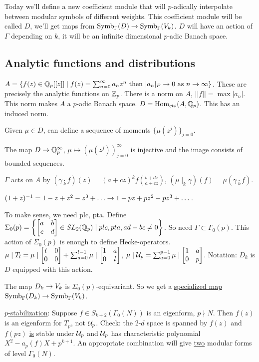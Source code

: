 \documentclass[]{article}
\begin{document}
Today we'll define a new coefficient module that will $p$-adically interpolate between modular symbols of different weights. This coefficient module will be called $D$, we'll get maps from $\text{Symb}_\Gamma(D) \rightarrow \text{Symb}_\Gamma(V_k)$. $D$ will have an action of $\Gamma$ depending on $k$, it will be an infinite dimensional $p$-adic Banach space.

\subsection*{Analytic functions and distributions}

$A = \{f(z)\in \mathbb{Q}_p[[z]]\mid f(z) = \sum_{n=0}^\infty a_n z^n \text{ then }|a_n|_P \rightarrow 0 \text{ as } n\rightarrow \infty \}$. These are precisely the analytic functions on $\mathbb{Z}_p$. There is a norm on $A$, $||f|| = \max|a_n|$. This  norm makes $A$ a $p$-adic Banach space. $D = \text{Hom}_{cts}(A,\mathbb{Q}_p)$. This has an induced norm.

Given $\mu\in D$, can define a sequence of moments $\{\mu(z^j)\}_{j=0}$.

\begin{theorem}
	The map $D\rightarrow \mathbb{Q}_p^\infty$, $\mu\mapsto (\mu(z^j))_{j=0}^\infty$ is injective and the image consists of bounded sequences.
\end{theorem}
$\Gamma$ acts on $A$ by $(\gamma\underset{k}{\cdot}f)(z) = (a+cz)^k f(\frac{b+dz}{a+cz})$, $(\mu\mid_k\gamma)(f) = \mu(\gamma\underset{k}{\cdot}f)$.

\begin{example}
	$(1+z)\inv = 1-z+z^2-z^3+\dots \ra 1-pz+pz^2-pz^3+\dots$.
\end{example}
To make sense, we need plc, pta. Define $\Sigma_0(p) = \left\{\begin{bmatrix}a&b\\c&d\end{bmatrix} \in SL_2(\mathbb{Q}_p) \mid plc,pta,ad-bc\neq 0\right\}$. So need $\Gamma\subset\Gamma_0(p)$.
This action of $\Sigma_0(p)$ is enough to define Hecke-operators. $\mu\mid T_l = \mu\mid\begin{bmatrix}l&0\\0&0\end{bmatrix} + \sum_{a=0}^{l-1} \mu\mid\begin{bmatrix}1&a\\0&l\end{bmatrix}$, $\mu\mid \mathcal{U}_p = \sum_{a=0}^{p-1} \mu \mid \begin{bmatrix}1&a\\0&p\end{bmatrix}$. Notation: $D_k$ is $D$ equipped with this action.

\begin{proposition}
	The map $D_k \rightarrow V_k$ is $\Sigma_0(p)$-equivariant. So we get a \ul{specialized map} $\text{Symb}_\Gamma(D_k) \rightarrow \text{Symb}_\Gamma(V_k)$.
\end{proposition}
\ul{$p$-stabilization}: Suppose $f\in S_{k+2}(\Gamma_0(N))$ is an eigenform, $p\nmid N$. Then $f(z)$ is an eigenform for $T_p$, not $\mathcal{U}_p$. Check: the 2-$d$ space is spanned by $f(z)$ and $f(pz)$ \ul{is} stable under $\mathcal{U}_p$ and $\mathcal{U}_p$ has characteristic polynomial $X^2-a_p(f)X+p^{k+1}$. An appropriate combination will give \ul{two} modular forms of level $\Gamma_0(N)$.
\end{document}
